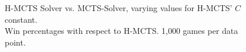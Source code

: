 \begin{figure}[ht]
     \caption[H-MCTS Solver with different $C$ values]{H-MCTS Solver vs. MCTS-Solver, varying values for H-MCTS' $C$ constant. \\ Win percentages with respect to H-MCTS. 1,000 games per data point.}
     \label{fig:h-mcts-s_v_mcts-s_uct_c}
\end{figure}

